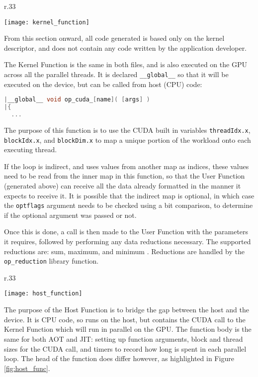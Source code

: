 \begin{wrapfigure}[13]{r}{.33\textwidth}
  \centering
  \caption{Kernel Files with Kernel Function}
  \label{fig:krnl_func}
  \texttt{[image: kernel\_function]}
\end{wrapfigure}
From this section onward, all code generated is based only on the kernel descriptor, and does not contain any code written by the application developer.
\par The Kernel Function is the same in both files, and is also executed on the GPU across all the parallel threads. It is declared \verb|__global__| so that it will be executed on the device, but can be called from host (CPU) code:
\begin{lstlisting}[language=C, backgroundcolor=\color{red!20}]
|__global__ void op_cuda_[name]( [args] )
|{
  ...
\end{lstlisting}

\noindent The purpose of this function is to use the CUDA built in variables \verb|threadIdx.x|, \verb|blockIdx.x|, and \verb|blockDim.x| to map a unique portion of the workload onto each executing thread.

 If the loop is indirect, and uses values from another map as indices, these values need to be read from the inner map in this function, so that the User Function (generated above) can receive all the data already formatted in the manner it expects to receive it. It is possible that the indirect map is optional, in which case the \verb|optflags| argument needs to be checked using a bit comparison, to determine if the optional argument was passed or not.
\par
Once this is done, a call is then made to the User Function with the parameters it requires, followed by performing any data reductions necessary. The supported reductions are: sum, maximum, and minimum \cite[p11]{manual}. Reductions are handled by the \verb|op_reduction| library function.

\begin{wrapfigure}[10]{r}{.33\textwidth}
  \centering
  \caption{Kernel Files with Host Function}
  \label{fig:host_func}
  \texttt{[image: host\_function]}
\end{wrapfigure}
The purpose of the Host Function is to bridge the gap between the host and the device. It is CPU code, so runs on the host, but contains the CUDA call to the Kernel Function which will run in parallel on the GPU. The function body is the same for both AOT and JIT: setting up function arguments, block and thread sizes for the CUDA call, and timers to record how long is spent in each parallel loop. The head of the function does differ however, as highlighted in Figure \ref{fig:host_func}.
\vspace{\parskip}

